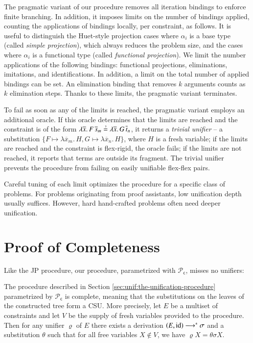 The pragmatic variant of our procedure removes all iteration bindings to enforce finite branching. 
In addition, it
imposes limits 
on the number of bindings applied,
counting the applications of bindings locally, per
constraint, as follows. 
It is useful to distinguish the Huet-style projection cases where
$\alpha_i$ is a base type (called \emph{simple projection}), which always
reduces the problem size, and the cases where $\alpha_i$ is a functional type (called \emph{functional
projection}). We limit the number applications of the following bindings:
functional projections, eliminations, imitations, and identifications.
In addition,
a limit on the total number of applied bindings can be set. 
An elimination binding that removes $k$ arguments counts as $k$
elimination steps.
Thanks to these limits, the pragmatic variant 
terminates.

To fail as soon as any of the limits
is reached, the pragmatic variant employs an additional oracle.
If this oracle determines that the limits are reached and the constraint is of the form
$\lambda \overline{x}.\, F \, \overline{s}_m \unif \lambda \overline{x}.\, G \, \overline{t}_n$, it returns a \emph{trivial unifier} --
a substitution $\{ F \mapsto \lambda \overline{x}_m.\, H, G \mapsto \lambda \overline{x}_n.\, H \}$, where $H$ is a fresh variable; if the limits are reached and
the constraint is flex-rigid, the oracle fails; if the limits are not reached, 
it reports that terms are outside its fragment. The trivial unifier prevents the procedure from failing on
easily unifiable flex-flex pairs.

Careful tuning of each limit optimizes the procedure for a specific class of problems. 
For problems originating from proof assistants, low unification depth usually suffices. However, hard
hand-crafted problems often need
deeper unification.




\section{Proof of Completeness}
\label{sec:unif:proof-of-completeness}

Like the JP procedure, our procedure, parametrized with $\mathcal{P}_\mathsf{c}$,  misses no unifiers:

\begin{theorem}
\label{thm:completeness}
The procedure described in Section \ref{sec:unif:the-unification-procedure}
parametrized by $\mathcal{P}_\mathsf{c}$ is complete, meaning that the
substitutions on the leaves of the constructed tree form a CSU.
More precisely, let $E$ be a multiset of constraints
and let $V$ be the supply of fresh variables provided to the procedure. 
Then for any unifier $\varrho$ of $E$ there exists
a derivation $\left(E,\makeop{id}\right)\longrightarrow^{*}\sigma$ and a
substitution $\theta$ such that for all free variables $X\not\in V$, we have $\varrho X = \theta\sigma X$.
\end{theorem}

